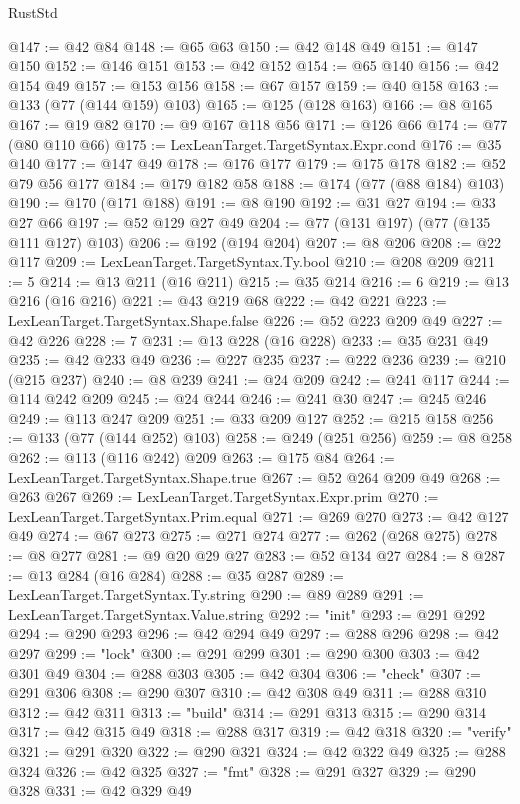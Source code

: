 \begin{lexlean}{RustStd}
\begin{coremodule}
{\begin{coremodule}
{{{{{{{{{{{{{@147 := @42 @84
@148 := @65 @63
@150 := @42 @148 @49
@151 := @147 @150
@152 := @146 @151
@153 := @42 @152
@154 := @65 @140
@156 := @42 @154 @49
@157 := @153 @156
@158 := @67 @157
@159 := @40 @158
@163 := @133 (@77 (@144 @159) @103)
@165 := @125 (@128 @163)
@166 := @8 @165
@167 := @19 @82
@170 := @9 @167 @118 @56
@171 := @126 @66
@174 := @77 (@80 @110 @66)
@175 := LexLeanTarget.TargetSyntax.Expr.cond
@176 := @35 @140
@177 := @147 @49
@178 := @176 @177
@179 := @175 @178
@182 := @52 @79 @56 @177
@184 := @179 @182 @58
@188 := @174 (@77 (@88 @184) @103)
@190 := @170 (@171 @188)
@191 := @8 @190
@192 := @31 @27
@194 := @33 @27 @66
@197 := @52 @129 @27 @49
@204 := @77 (@131 @197) (@77 (@135 @111 @127) @103)
@206 := @192 (@194 @204)
@207 := @8 @206
@208 := @22 @117
@209 := LexLeanTarget.TargetSyntax.Ty.bool
@210 := @208 @209
@211 := 5
@214 := @13 @211 (@16 @211)
@215 := @35 @214
@216 := 6
@219 := @13 @216 (@16 @216)
@221 := @43 @219 @68
@222 := @42 @221
@223 := LexLeanTarget.TargetSyntax.Shape.false
@226 := @52 @223 @209 @49
@227 := @42 @226
@228 := 7
@231 := @13 @228 (@16 @228)
@233 := @35 @231 @49
@235 := @42 @233 @49
@236 := @227 @235
@237 := @222 @236
@239 := @210 (@215 @237)
@240 := @8 @239
@241 := @24 @209
@242 := @241 @117
@244 := @114 @242 @209
@245 := @24 @244
@246 := @241 @30
@247 := @245 @246
@249 := @113 @247 @209
@251 := @33 @209 @127
@252 := @215 @158
@256 := @133 (@77 (@144 @252) @103)
@258 := @249 (@251 @256)
@259 := @8 @258
@262 := @113 (@116 @242) @209
@263 := @175 @84
@264 := LexLeanTarget.TargetSyntax.Shape.true
@267 := @52 @264 @209 @49
@268 := @263 @267
@269 := LexLeanTarget.TargetSyntax.Expr.prim
@270 := LexLeanTarget.TargetSyntax.Prim.equal
@271 := @269 @270
@273 := @42 @127 @49
@274 := @67 @273
@275 := @271 @274
@277 := @262 (@268 @275)
@278 := @8 @277
@281 := @9 @20 @29 @27
@283 := @52 @134 @27
@284 := 8
@287 := @13 @284 (@16 @284)
@288 := @35 @287
@289 := LexLeanTarget.TargetSyntax.Ty.string
@290 := @89 @289
@291 := LexLeanTarget.TargetSyntax.Value.string
@292 := "init"
@293 := @291 @292
@294 := @290 @293
@296 := @42 @294 @49
@297 := @288 @296
@298 := @42 @297
@299 := "lock"
@300 := @291 @299
@301 := @290 @300
@303 := @42 @301 @49
@304 := @288 @303
@305 := @42 @304
@306 := "check"
@307 := @291 @306
@308 := @290 @307
@310 := @42 @308 @49
@311 := @288 @310
@312 := @42 @311
@313 := "build"
@314 := @291 @313
@315 := @290 @314
@317 := @42 @315 @49
@318 := @288 @317
@319 := @42 @318
@320 := "verify"
@321 := @291 @320
@322 := @290 @321
@324 := @42 @322 @49
@325 := @288 @324
@326 := @42 @325
@327 := "fmt"
@328 := @291 @327
@329 := @290 @328
@331 := @42 @329 @49
}}}}}}}}}}}}}
\end{coremodule}}
\end{coremodule}
\end{lexlean}
